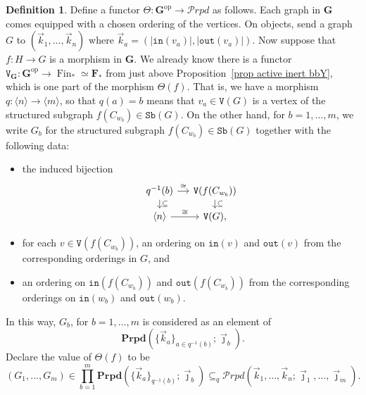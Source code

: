 \documentclass{amsart}
\numberwithin{theorem}{subsection}
\theoremstyle{definition}
\newtheorem{definition}[theorem]{Definition}
\providecommand{\op}{\mathrm{op}}
\newcommand{\finset}{\operatorname{Fin}}
\newcommand{\pfinset}{\finset_*}
\newcommand{\finsetskel}{\mathbf{F}}
\newcommand{\pfinsetskel}{\finsetskel_*}
\newcommand{\bbY}{\mathbf{G}}
\newcommand{\sub}{\mathtt{Sb}}
\newcommand{\out}{\mathtt{out}}
\newcommand{\inp}{\mathtt{in}}
\newcommand{\vertex}{\mathtt{V}}
\newcommand{\calproperad}{\mathcal{P}rpd}
\newcommand{\bfproperad}{\mathbf{Prpd}}
\newcommand{\nsqelt}[1]{\vec{#1}}
\begin{document}
\begin{definition}
\label{definition of Theta}
Define a functor $\Theta \colon \bbY^\op \to \calproperad$ as follows.
Each graph in $\bbY$ comes equipped with a chosen ordering of the vertices.
On objects, send a graph $G$ to $(\nsqelt{k}_1, \dots, \nsqelt{k}_n)$ where $\nsqelt{k}_a = (|\inp(v_a)|, |\out(v_a)|)$.
Now suppose that $f \colon H \to G$ is a morphism in $\bbY$.
We already know there is a functor $\vertex_\bbY\colon \bbY^{\op} \to \pfinset\simeq \pfinsetskel$ from just above Proposition~\ref{prop active inert bbY}, which is one part of the morphism $\Theta(f)$. 
That is, we have a morphism $q \colon  \langle n \rangle \to \langle m \rangle$, so that $q(a) = b$ means that $v_a \in \vertex(G)$ is a vertex of the structured subgraph $f(C_{w_b}) \in \sub(G)$.
On the other hand, for $b = 1, \dots, m$, we write $G_b$ for the structured subgraph $f(C_{w_b}) \in \sub(G)$ together with the following data:
\begin{itemize}
	\item the induced bijection
	\[ \begin{tikzcd}[sep=small]
	q^{-1}(b) \dar["\subseteq"] \rar["\cong"] & \vertex(f(C_{w_b})) \dar["\subseteq"] \\
	\langle n \rangle \rar["\cong"] & \vertex(G),
	\end{tikzcd} \]
	\item for each $v\in \vertex(f(C_{w_b}))$, an ordering on $\inp(v)$ and $\out(v)$ from the corresponding orderings in $G$, and
	\item an ordering on $\inp(f(C_{w_b}))$ and $\out(f(C_{w_b}))$ from the corresponding orderings on $\inp(w_b)$ and $\out(w_b)$.
\end{itemize}
In this way, $G_b$, for $b=1,\dots, m$ is considered as an element of 
\[
	\bfproperad( \{\nsqelt{k}_a\}_{a \in q^{-1}(b)}; \nsqelt{\jmath}_b).
\]
Declare the value of $\Theta(f)$ to be
\[
	(G_1, \dots, G_m) \in \prod_{b=1}^m \bfproperad(\{\nsqelt{k}_a\}_{q^{-1}(b)}; \nsqelt{\jmath}_b) \subseteq_{q} \calproperad(\nsqelt{k}_1, \dots, \nsqelt{k}_n; \nsqelt{\jmath}_1, \dots, \nsqelt{\jmath}_m).
\]
\end{definition}
\end{document}
